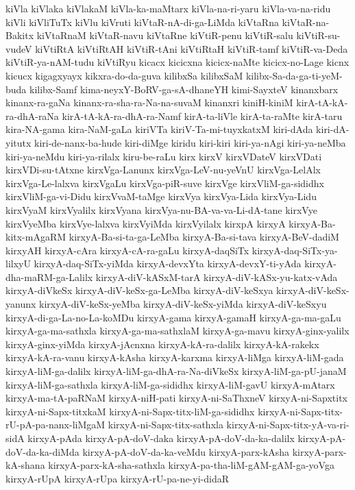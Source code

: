 {kiVla
kiVlaka
kiVlakaM
kiVla-ka-maMtarx
kiVla-na-ri-yaru
kiVla-va-na-ridu
kiVli
kiVliTuTx
kiVlu
kiVruti
kiVtaR-nA-di-ga-LiMda
kiVtaRna
kiVtaR-na-Bakitx
kiVtaRnaM
kiVtaR-navu
kiVtaRne
kiVtiR-penu
kiVtiR-salu
kiVtiR-su-vudeV
kiVtiRtA
kiVtiRtAH
kiVtiR-tAni
kiVtiRtaH
kiVtiR-tamf
kiVtiR-va-Deda
kiVtiR-ya-nAM-tudu
kiVtiRyu
kicacx
kicicxna
kicicx-naMte
kicicx-no-Lage
kicnx
kicucx
kigagxyayx
kikxra-do-da-guva
kilibxSa
kilibxSaM
kilibx-Sa-da-ga-ti-yeM-buda
kilibx-Samf
kima-neyxY-BoRV-ga-sA-dhaneYH
kimi-SayxteV
kinanxbarx
kinanx-ra-gaNa
kinanx-ra-sha-ra-Na-na-suvaM
kinanxri
kiniH-kiniM
kirA-tA-kA-ra-dhA-raNa
kirA-tA-kA-ra-dhA-ra-Namf
kirA-ta-liVle
kirA-ta-raMte
kirA-taru
kira-NA-gama
kira-NaM-gaLa
kiriVTa
kiriV-Ta-mi-tuyxkatxM
kiri-dAda
kiri-dA-yitutx
kiri-de-nanx-ba-hude
kiri-diMge
kiridu
kiri-kiri
kiri-ya-nAgi
kiri-ya-neMba
kiri-ya-neMdu
kiri-ya-rilalx
kiru-be-raLu
kirx
kirxV
kirxVDateV
kirxVDati
kirxVDi-su-tAtxne
kirxVga-Lanunx
kirxVga-LeV-nu-yeVnU
kirxVga-LelAlx
kirxVga-Le-lalxva
kirxVgaLu
kirxVga-piR-suve
kirxVge
kirxVliM-ga-sididhx
kirxVliM-ga-vi-Didu
kirxVvaM-taMge
kirxVya
kirxVya-Lida
kirxVya-Lidu
kirxVyaM
kirxVyalilx
kirxVyana
kirxVya-nu-BA-va-va-Li-dA-tane
kirxVye
kirxVyeMba
kirxVye-lalxva
kirxVyiMda
kirxVyilalx
kirxpA
kirxyA
kirxyA-Ba-kitx-mAgaRM
kirxyA-Ba-si-ta-ga-LeMba
kirxyA-Ba-si-tava
kirxyA-BeV-dadiM
kirxyAH
kirxyA-cAra
kirxyA-cA-ra-gaLu
kirxyA-daqSiTx
kirxyA-daq-SiTx-ya-lilxyU
kirxyA-daq-SiTx-yiMda
kirxyA-devxYta
kirxyA-devxY-ti-yAda
kirxyA-dha-maRM-ga-Lalilx
kirxyA-diV-kASxM-tarA
kirxyA-diV-kASx-yu-katx-vAda
kirxyA-diVkeSx
kirxyA-diV-keSx-ga-LeMba
kirxyA-diV-keSxya
kirxyA-diV-keSx-yanunx
kirxyA-diV-keSx-yeMba
kirxyA-diV-keSx-yiMda
kirxyA-diV-keSxyu
kirxyA-di-ga-La-no-La-koMDu
kirxyA-gama
kirxyA-gamaH
kirxyA-ga-ma-gaLu
kirxyA-ga-ma-sathxla
kirxyA-ga-ma-sathxlaM
kirxyA-ga-mavu
kirxyA-ginx-yalilx
kirxyA-ginx-yiMda
kirxyA-jAcnxna
kirxyA-kA-ra-dalilx
kirxyA-kA-rakekx
kirxyA-kA-ra-vanu
kirxyA-kAsha
kirxyA-karxma
kirxyA-liMga
kirxyA-liM-gada
kirxyA-liM-ga-dalilx
kirxyA-liM-ga-dhA-ra-Na-diVkeSx
kirxyA-liM-ga-pU-janaM
kirxyA-liM-ga-sathxla
kirxyA-liM-ga-sididhx
kirxyA-liM-gavU
kirxyA-mAtarx
kirxyA-ma-tA-paRNaM
kirxyA-niH-pati
kirxyA-ni-SaThxneV
kirxyA-ni-Sapxtitx
kirxyA-ni-Sapx-titxkaM
kirxyA-ni-Sapx-titx-liM-ga-sididhx
kirxyA-ni-Sapx-titx-rU-pA-pa-nanx-liMgaM
kirxyA-ni-Sapx-titx-sathxla
kirxyA-ni-Sapx-titx-yA-va-ri-sidA
kirxyA-pAda
kirxyA-pA-doV-daka
kirxyA-pA-doV-da-ka-dalilx
kirxyA-pA-doV-da-ka-diMda
kirxyA-pA-doV-da-ka-veMdu
kirxyA-parx-kAsha
kirxyA-parx-kA-shana
kirxyA-parx-kA-sha-sathxla
kirxyA-pa-tha-liM-gAM-gAM-ga-yoVga
kirxyA-rUpA
kirxyA-rUpa
kirxyA-rU-pa-ne-yi-didaR
}
